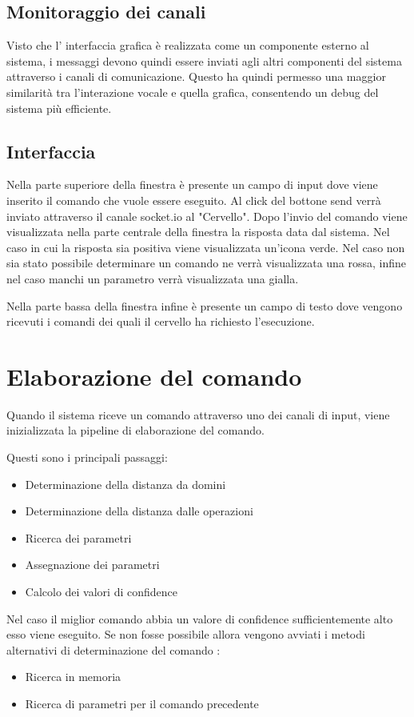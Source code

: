 \documentclass[twoside]{supsistudent}
\begin{document}
\section{Monitoraggio dei canali}
Visto che l' interfaccia grafica è realizzata come un componente esterno al sistema, i messaggi devono quindi essere inviati agli altri componenti del sistema attraverso i canali di comunicazione. Questo ha quindi permesso una maggior similarità tra l'interazione vocale e quella grafica, consentendo un debug del sistema più efficiente.
\section{Interfaccia}
Nella parte superiore della finestra è presente un campo di input dove viene inserito il comando che vuole essere eseguito. Al click del bottone send verrà inviato attraverso il canale socket.io al "Cervello".
Dopo l'invio del comando viene visualizzata nella parte centrale della finestra la risposta data dal sistema.
Nel caso in cui la risposta sia positiva viene visualizzata un'icona verde. Nel caso non sia stato possibile determinare un comando ne verrà visualizzata una rossa, infine nel caso manchi un parametro verrà visualizzata una gialla.

Nella parte bassa della finestra infine è presente un campo di testo dove vengono ricevuti i comandi dei quali il cervello ha richiesto l'esecuzione.
\chapter{Elaborazione del comando}
Quando il sistema riceve un comando attraverso uno dei canali di input, viene inizializzata la pipeline di elaborazione del comando.

Questi sono i principali passaggi: 
\begin{itemize}
	\item Determinazione della distanza da domini
	\item Determinazione della distanza dalle operazioni
	\item Ricerca dei parametri
	\item Assegnazione dei parametri
	\item Calcolo dei valori di confidence
\end{itemize}
Nel caso il miglior comando abbia un valore di confidence sufficientemente alto esso viene eseguito. Se non fosse possibile allora vengono avviati i metodi alternativi di determinazione del comando :
\begin{itemize}
	\item Ricerca in memoria
	\item Ricerca di parametri per il comando precedente
\end{itemize}
\end{document}
